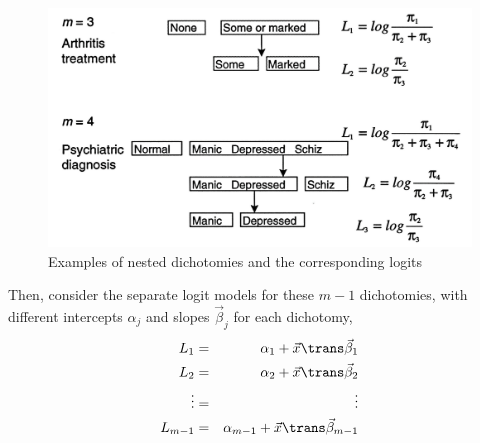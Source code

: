 \documentclass[11pt]{book}
\begin{document}
\begin{figure}[htb]
  \centering
  \includegraphics[width=.8\textwidth]{ch07/fig/nested1c}
  \caption[Nested dichotomies]{Examples of nested dichotomies and the corresponding logits}\label{fig:nested1}
\end{figure}

Then, consider the separate logit models for these $m-1$ dichotomies, with different
intercepts $\alpha_j$ and slopes $\vec{\beta}_j$ for each dichotomy,
\begin{eqnarray*}
  L_1 & = & \alpha_1 + \vec{x} \trans \vec{\beta}_1 \\
  L_2 & = & \alpha_2 + \vec{x} \trans \vec{\beta}_2 \\
  \vdots & = & \vdots \\
  L_{m-1} & = & \alpha_{m-1} + \vec{x} \trans \vec{\beta}_{m-1} \\  
\end{eqnarray*}
\end{document}
